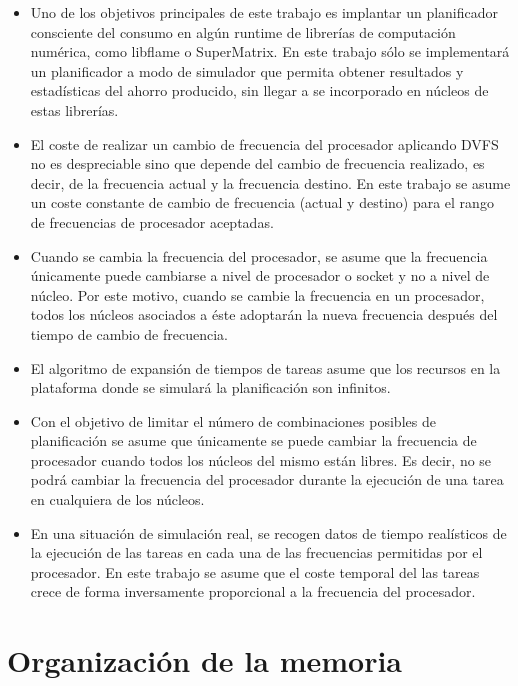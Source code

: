 \begin{itemize}
 \item Uno de los objetivos principales de este trabajo es implantar un planificador
consciente del consumo en algún runtime de librerías de computación numérica, como
libflame o SuperMatrix. En este trabajo sólo se implementará un planificador a modo
de simulador que permita obtener resultados y estadísticas del ahorro producido, 
sin llegar a se incorporado en núcleos de estas librerías.

 \item El coste de realizar un cambio de frecuencia del procesador aplicando DVFS
no es despreciable sino que depende del cambio de frecuencia realizado, es decir, de la frecuencia actual 
y la frecuencia destino. En este trabajo se asume un coste constante de cambio de 
frecuencia (actual y destino) para el rango de frecuencias de procesador aceptadas.

 \item Cuando se cambia la frecuencia del procesador, se asume que la frecuencia
únicamente puede cambiarse a nivel de procesador o socket y no a nivel de núcleo.
Por este motivo, cuando se cambie la frecuencia en un procesador, todos los núcleos
asociados a éste adoptarán la nueva frecuencia después del tiempo de cambio de frecuencia.

 \item El algoritmo de expansión de tiempos de tareas asume que los recursos
en la plataforma donde se simulará la planificación son infinitos.

 \item Con el objetivo de limitar el número de combinaciones posibles de planificación
se asume que únicamente se puede cambiar la frecuencia de procesador
cuando todos los núcleos del mismo están libres. Es decir, no se podrá
cambiar la frecuencia del procesador durante la ejecución de una tarea en cualquiera
de los núcleos.

 \item En una situación de simulación real, se recogen datos de tiempo realísticos de la
ejecución de las tareas en cada una de las frecuencias permitidas por el procesador.
En este trabajo se asume que el coste temporal del las tareas crece de forma inversamente
proporcional a la frecuencia del procesador.
\end{itemize}

\newpage
\section{Organización de la memoria}

